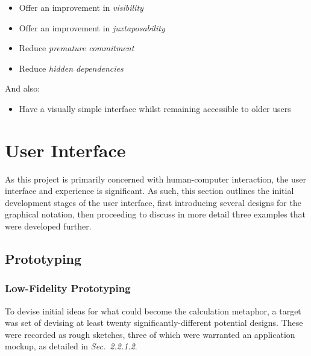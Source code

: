 \documentclass[12pt,twoside,notitlepage,xetex]{report}
\begin{document}
\begin{itemize}
\item Offer an improvement in \emph{visibility}
\item Offer an improvement in \emph{juxtaposability}
\item Reduce \emph{premature commitment}
\item Reduce \emph{hidden dependencies}
\end{itemize}

And also:

\begin{itemize}
\item Have a visually simple interface whilst remaining accessible to older users
\end{itemize}

\section{User Interface}

As this project is primarily concerned with human-computer interaction, the user interface and experience is significant.  As such, this section outlines the initial development stages of the user interface, first introducing several designs for the graphical notation, then proceeding to discuss in more detail three examples that were developed further.

\subsection{Prototyping}

\subsubsection{Low-Fidelity Prototyping}

To devise initial ideas for what could become the calculation metaphor, a target was set of devising at least twenty significantly-different potential designs.  These were recorded as rough sketches, three of which were warranted an application mockup, as detailed in \emph{Sec.~2.2.1.2}.
\end{document}
